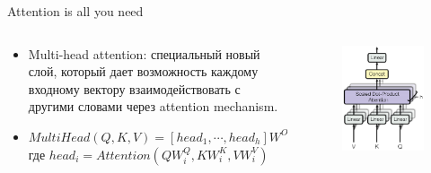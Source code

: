 \begin{frame}[c]{Attention is all you need}
\begin{columns}[c]
	\begin{column}{0.7\textwidth}
		\begin{itemize}
			\item Multi-head attention: специальный новый слой, который дает возможность каждому входному вектору взаимодействовать с другими словами через attention mechanism.
			\item $MultiHead(Q,K,V) = [head_1, \cdots,head_h]W^O,$ где  $head_i=Attention(QW^Q_i,KW^K_i,VW^V_i)$
		\end{itemize}
	\end{column}
	\begin{column}{0.3\textwidth}
		\begin{figure}
			\centering
			\includegraphics[width=1.0\textwidth]{figures/multiheadattention.png}
		\end{figure}
	\end{column}
\end{columns}
\end{frame}

